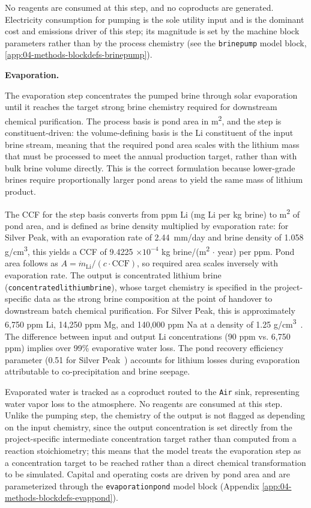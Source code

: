 \documentclass{article}
\renewcommand\_{\textunderscore\allowbreak}
\begin{document}
No reagents are consumed at this step, and no coproducts are generated. Electricity consumption for pumping is the sole utility input and is the dominant cost and emissions driver of this step; its magnitude is set by the machine block parameters rather than by the process chemistry (see the \texttt{brine\_pump} model block, \ref{app:04-methods-blockdefs-brinepump}). 

\medskip
\noindent\textbf{Evaporation.}\quad

The evaporation step concentrates the pumped brine through solar evaporation until it reaches the target strong brine chemistry required for downstream chemical purification. The process basis is pond area in \si{m^2}, and the step is constituent-driven: the volume-defining basis is the Li constituent of the input brine stream, meaning that the required pond area scales with the lithium mass that must be processed to meet the annual production target, rather than with bulk brine volume directly. This is the correct formulation because lower-grade brines require proportionally larger pond areas to yield the same mass of lithium product.

The CCF for the step basis converts from ppm Li (mg Li per kg brine) to \si{m^2} of pond area, and is defined as brine density multiplied by evaporation rate: for Silver Peak, with an evaporation rate of 2.44~mm/day and brine density of 1.058 \si{g/cm^3}, this yields a CCF of 9.4225 $\times 10^{-4}$ kg brine/(\si{m^2} $\cdot$ year) per ppm. Pond area follows as $A = \dot m_{\text{Li}}/(c \cdot \text{CCF})$, so required area scales inversely with evaporation rate. The output is concentrated lithium brine (\texttt{concentrated\_lithium\_brine}), whose target chemistry is specified in the project-specific data as the strong brine composition at the point of handover to downstream batch chemical purification. For Silver Peak, this is approximately 6,750 ppm Li, 14,250 ppm Mg, and 140,000 ppm Na at a density of 1.25 \si{g/cm^3}~\cite{srkconsultingSECTechnicalReport2023a}. The difference between input and output Li concentrations (90 ppm vs. 6,750 ppm) implies over 99\% evaporative water loss. The pond recovery efficiency parameter (0.51 for Silver Peak~\cite{srkconsultingSECTechnicalReport2023a}) accounts for lithium losses during evaporation attributable to co-precipitation and brine seepage.

Evaporated water is tracked as a coproduct routed to the \texttt{Air} sink, representing water vapor loss to the atmosphere. No reagents are consumed at this step. Unlike the pumping step, the chemistry of the output is not flagged as depending on the input chemistry, since the output concentration is set directly from the project-specific intermediate concentration target rather than computed from a reaction stoichiometry; this means that the model treats the evaporation step as a concentration target to be reached rather than a direct chemical transformation to be simulated. Capital and operating costs are driven by pond area and are parameterized through the \texttt{evaporation\_pond} model block (Appendix \ref{app:04-methods-blockdefs-evappond}).
\end{document}
